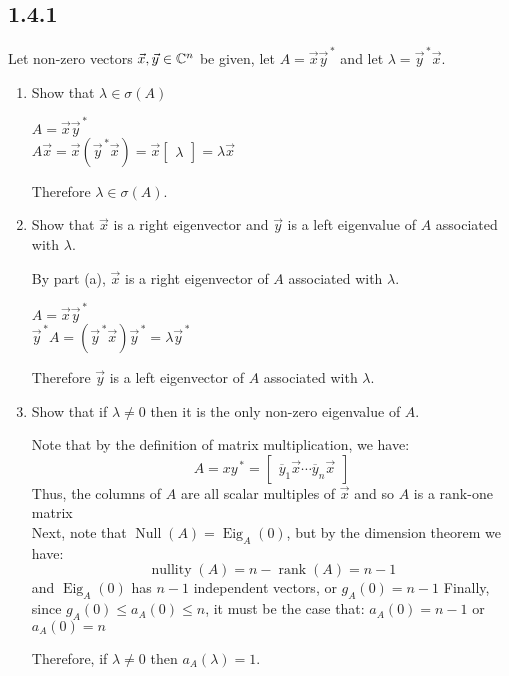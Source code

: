 \documentclass[letterpaper,12pt,fleqn]{article}
\renewcommand{\l}{\lambda}
\newcommand{\vx}{\vec{x}}
\newcommand{\vy}{\vec{y}}
\DeclareMathOperator{\Null}{Null}
\DeclareMathOperator{\Eig}{Eig}
\DeclareMathOperator{\rnk}{rank}
\DeclareMathOperator{\nullity}{nullity}
\newcommand{\yb}{\overline{y}}
\begin{document}
\subsection*{1.4.1}

Let non-zero vectors $\vx,\vy\in\C^n$ be given, let $A=\vx\vy^{\,*}$ and let
$\l=\vy^{\,*}\vx$.
\begin{enumerate}[label=\alph*)]
\item Show that $\l\in\sigma(A)$

  $A=\vx\vy^{\,*}$ \\
  $A\vx=\vx(\vy^{\,*}\vx)=\vx\begin{bmatrix}\l\end{bmatrix}=\l\vx$

  Therefore $\l\in\sigma(A)$.

\item Show that $\vx$ is a right eigenvector and $\vy$ is a left eigenvalue of
  $A$ associated with $\l$.

  By part (a), $\vx$ is a right eigenvector of $A$ associated with $\l$.

  $A=\vx\vy^{\,*}$ \\
  $\vy^{\,*}A=(\vy^{\,*}\vx)\vy^{\,*}=\l\vy^{\,*}$

  Therefore $\vy$ is a left eigenvector of $A$ associated with $\l$.

\item Show that if $\l\ne0$ then it is the only non-zero eigenvalue of $A$.

  Note that by the definition of matrix multiplication, we have:
  \[A=xy^{\,*}=\begin{bmatrix}\yb_1\vx\cdots\yb_n\vx\end{bmatrix}\]
  Thus, the columns of $A$ are all scalar multiples of $\vx$ and so $A$ is a
  rank-one matrix \\
  Next, note that $\Null(A)=\Eig_A(0)$, but by the dimension theorem we have:
  \[\nullity(A)=n-\rnk(A)=n-1\]
  and $\Eig_A(0)$ has $n-1$ independent vectors, or $g_A(0)=n-1$
  Finally, since $g_A(0)\le a_A(0)\le n$, it must be the case that:
  $a_A(0)=n-1$ or $a_A(0)=n$
  
  Therefore, if $\l\ne0$ then $a_A(\l)=1$.
\end{enumerate}
\end{document}
